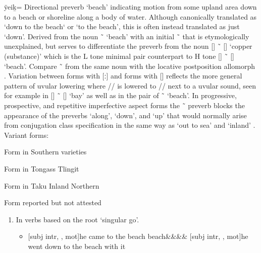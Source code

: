 \begin{morphdesc}[resume*=alphalist]
\item[ÿeiḵ=]\label{m:ÿeiḵ=}
	Directional preverb ‘beach’ indicating motion from some upland area down to a beach
		or shoreline along a body of water.
	Although canonically translated as ‘down to the beach‘ or ‘to the beach’, this is often
		instead translated as just ‘down’.
	Derived from the noun  \~\  ‘beach’
		with an initial  \~\  that is etymologically unexplained,
		but serves to differentiate the preverb from the noun
		 [] \~\  [] ‘copper (substance)’
		which is the L tone minimal pair counterpart
		to H tone  [] \~\  [] ‘beach’.
	Compare  \~\  from the same noun with the locative postposition
		allomorph .
	Variation between forms with  [ː] and forms with  []
		reflects the more general pattern of uvular lowering where  //
		is lowered to  // next to a uvular sound, seen for example in
		 [] \~\  [] ‘bay’ as well as in the
		pair of  \~\  ‘beach’.
	In progressive, prospective, and repetitive imperfective aspect forms the
		 \~\  preverb blocks the appearance of
		the preverbs  ‘along’,  ‘down’, and  ‘up’
		that would normally arise from conjugation class specification
		in the same way as  ‘out to sea’ and  ‘inland’
		\parencite[136]{leer:1991}.
	\newline
	Variant forms:
	\begin{allolist}
	\item[{\X{eeḵ=}}]
		Form in Southern varieties
	\item[{\X{eèḵ=}}]
		Form in Tongass Tlingit
	\item[\X{eiḵ=}]
		Form in Taku Inland Northern
	\item[\X{ÿeeḵ=}]
		Form reported but not attested
	\end{allolist}
	\begin{enumerate}
	\item	\label{item:ÿeiḵ=beach-gosg}
		In verbs based on the root  ‘singular go’.
		\begin{itemize}
		\item	{}[subj intr, , mot]{he came to the beach}
			\parencites[268.9]{swanton:1909}[03/185]{leer:1973}
					{beach&&&&\·}
			\versus {}[subj intr, , mot]{he went down to the beach with it}

\end{itemize}
\end{enumerate}
\end{morphdesc}
